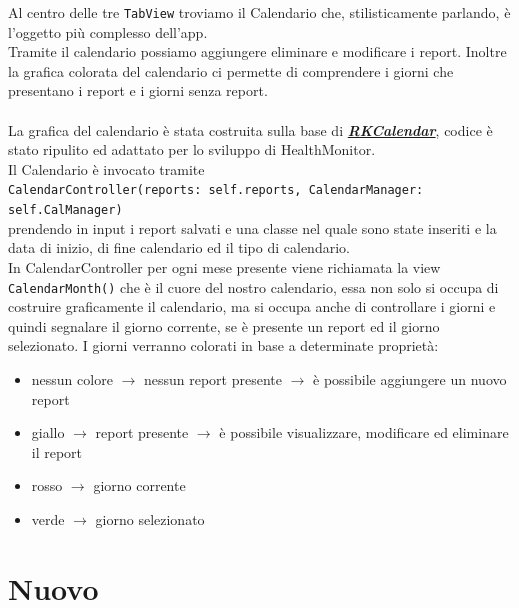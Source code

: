 \documentclass{article}
\begin{document}
Al centro delle tre \texttt{TabView} troviamo il Calendario che, stilisticamente parlando, è l'oggetto più complesso dell'app.\\
Tramite il calendario possiamo aggiungere eliminare e modificare i report. Inoltre la grafica colorata del calendario ci permette di comprendere i giorni che presentano i report e i giorni senza report. \\
\\
La grafica del calendario è stata costruita sulla base di \textbf{\textit{\href{https://github.com/RaffiKian/RKCalendar}{RKCalendar}}}, codice è stato ripulito ed adattato per lo sviluppo di HealthMonitor.\\
Il Calendario è invocato tramite \\
\texttt{CalendarController(reports: self.reports, CalendarManager: self.CalManager)} \\
prendendo in input i report salvati e una classe nel quale sono state inseriti e la data di inizio, di fine calendario ed il tipo di calendario.\\
In CalendarController per ogni mese presente viene richiamata la view \texttt{CalendarMonth()} che è il cuore del nostro calendario, essa non solo si occupa di costruire graficamente il calendario, ma si occupa anche di controllare i giorni e quindi segnalare il giorno corrente, se è presente un report ed il giorno selezionato. I giorni verranno colorati in base a determinate proprietà:
\begin{itemize}
  \item nessun colore $\rightarrow$ nessun report presente $\rightarrow$ è possibile aggiungere un nuovo report
  \item giallo $\rightarrow$ report presente $\rightarrow$ è possibile visualizzare, modificare ed eliminare il report
  \item rosso $\rightarrow$ giorno corrente 
  \item verde $\rightarrow$ giorno selezionato
\end{itemize}





\newpage
\section{Nuovo}
\end{document}
